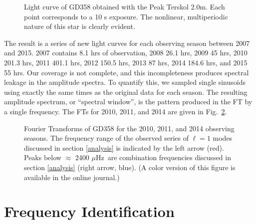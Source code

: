 \documentclass[12pt,preprint]{aastex}
\newcommand{\muHz}{\mbox{$\mu$Hz}}
\begin{document}
\begin{figure}
\caption{Light curve of GD358 obtained with the Peak Terskol 2.0m.  Each point corresponds 
to a 10 s exposure. The nonlinear, multiperiodic nature of this star is clearly evident.
\label{tersk}
}
\end{figure}

The result is a series of new light curves for each observing season between 2007 and 2015. 
2007 contains 8.1 hrs of observation, 2008 26.1 hrs, 2009 45 hrs, 2010 201.3 hrs, 2011 
401.1 hrs, 2012 150.5 hrs, 2013 87 hrs, 2014 184.6 hrs, and 2015 55 hrs. Our coverage is 
not complete, and this incompleteness produces spectral leakage in the amplitude spectra. 
To quantify this, we sampled single sinusoids using exactly the same times as the original 
data for each season. The resulting amplitude spectrum, or ``spectral window'', is the 
pattern produced in the FT by a single frequency. The FTs for 2010, 2011, and 2014 
are given in Fig.~\ref{fts}.


\begin{figure}
\caption{Fourier Transforms of GD358 for the 2010, 2011, and 2014 observing seasons.
The frequency range of the observed series of $\ell=1$ modes discussed in section \ref{analysis} 
is indicated by the left arrow (red).  Peaks below $\approx$ 2400 \muHz\ are combination 
frequencies discussed in section \ref{analysis} (right arrow, blue). 
(A color version of this figure is available in the online journal.)
\label{fts}
}
\end{figure}

\section{Frequency Identification}\label{freq}
 
\end{document}
